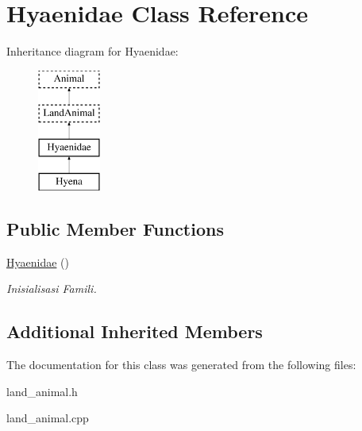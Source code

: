 \hypertarget{class_hyaenidae}{}\section{Hyaenidae Class Reference}
\label{class_hyaenidae}
Inheritance diagram for Hyaenidae\+:\begin{figure}[H]
\begin{center}
\leavevmode
\includegraphics[height=4.000000cm]{class_hyaenidae}
\end{center}
\end{figure}
\subsection*{Public Member Functions}
\begin{DoxyCompactItemize}
\item 
\hyperlink{class_hyaenidae_a3eaf473f80032d6c58f61d5eee1a2eb0}{Hyaenidae} ()\hypertarget{class_hyaenidae_a3eaf473f80032d6c58f61d5eee1a2eb0}{}\label{class_hyaenidae_a3eaf473f80032d6c58f61d5eee1a2eb0}

\begin{DoxyCompactList}\small\item\em Inisialisasi Famili. \end{DoxyCompactList}\end{DoxyCompactItemize}
\subsection*{Additional Inherited Members}


The documentation for this class was generated from the following files\+:\begin{DoxyCompactItemize}
\item 
land\+\_\+animal.\+h\item 
land\+\_\+animal.\+cpp\end{DoxyCompactItemize}

